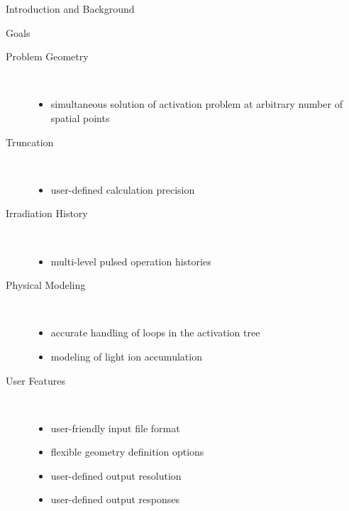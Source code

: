 \begin{chapter}{Introduction and Background}
\begin{section}{Goals}
    \renewcommand{\baselinestretch}{1.24}\normalsize
    \begin{description}
    \item[Problem Geometry]\ \\
      \vspace*{-1cm}
      \begin{itemize}
      \item simultaneous solution of activation problem at arbitrary
        number of spatial points
      \end{itemize}
    \item[Truncation]\ \\
      \vspace*{-1cm}
      \begin{itemize}
      \item user-defined calculation precision
      \end{itemize}
    \end{description}
    \newpage
    \begin{description}
    \item[Irradiation History]\ \\
      \vspace*{-1cm}
      \begin{itemize}
      \item multi-level pulsed operation histories
      \end{itemize}
    \item[Physical Modeling]\ \\
      \vspace*{-1cm}
      \begin{itemize}
      \item accurate handling of loops in the activation tree
      \item modeling of light ion accumulation
      \end{itemize}
    \item[User Features]\ \\
      \vspace*{-1cm}
      \begin{itemize}
      \item user-friendly input file format
      \item flexible geometry definition options
      \item user-defined output resolution
      \item user-defined output responses
      \end{itemize}
    \end{description}
    

\end{section}
\end{chapter}
